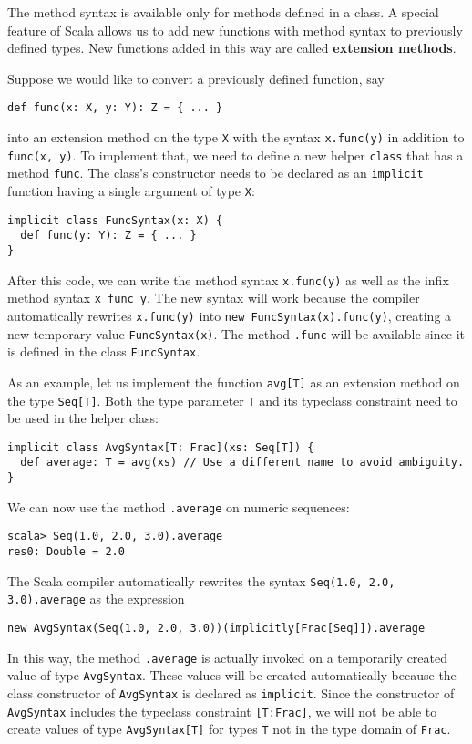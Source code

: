 The method syntax is available only for methods defined in a class.
A special feature of Scala allows us to add new functions with method
syntax to previously defined types. New functions added in this way
are called \textbf{extension methods}. 

Suppose we would like to convert a previously defined function, say
\begin{lstlisting}
def func(x: X, y: Y): Z = { ... }
\end{lstlisting}
into an extension method on the type \lstinline!X! with the syntax
\lstinline!x.func(y)! in addition to \lstinline!func(x, y)!. To
implement that, we need to define a new helper \lstinline!class!
that has a method \lstinline!func!. The class's constructor needs
to be declared as an \lstinline!implicit! function having a single
argument of type \lstinline!X!:
\begin{lstlisting}
implicit class FuncSyntax(x: X) {
  def func(y: Y): Z = { ... }
}
\end{lstlisting}
After this code, we can write the method syntax \lstinline!x.func(y)!
as well as the infix method syntax \lstinline!x func y!. The new
syntax will work because the compiler automatically rewrites \lstinline!x.func(y)!
into \lstinline!new FuncSyntax(x).func(y)!, creating a new temporary
value \lstinline!FuncSyntax(x)!. The method \lstinline!.func! will
be available since it is defined in the class \lstinline!FuncSyntax!. 

As an example, let us implement the function \lstinline!avg[T]! as
an extension method on the type \lstinline!Seq[T]!. Both the type
parameter \lstinline!T! and its typeclass constraint need to be used
in the helper class:
\begin{lstlisting}
implicit class AvgSyntax[T: Frac](xs: Seq[T]) {
  def average: T = avg(xs) // Use a different name to avoid ambiguity.
}
\end{lstlisting}
We can now use the method \lstinline!.average! on numeric sequences:
\begin{lstlisting}
scala> Seq(1.0, 2.0, 3.0).average
res0: Double = 2.0
\end{lstlisting}
The Scala compiler automatically rewrites the syntax \lstinline!Seq(1.0, 2.0, 3.0).average!
as the expression
\begin{lstlisting}
new AvgSyntax(Seq(1.0, 2.0, 3.0))(implicitly[Frac[Seq]]).average
\end{lstlisting}
In this way, the method \lstinline!.average! is actually invoked
on a temporarily created value of type \lstinline!AvgSyntax!. These
values will be created automatically because the class constructor
of \lstinline!AvgSyntax! is declared as \lstinline!implicit!. Since
the constructor of \lstinline!AvgSyntax! includes the typeclass constraint
\lstinline![T:Frac]!, we will not be able to create values of type
\lstinline!AvgSyntax[T]! for types \lstinline!T! not in the type
domain of \lstinline!Frac!.

